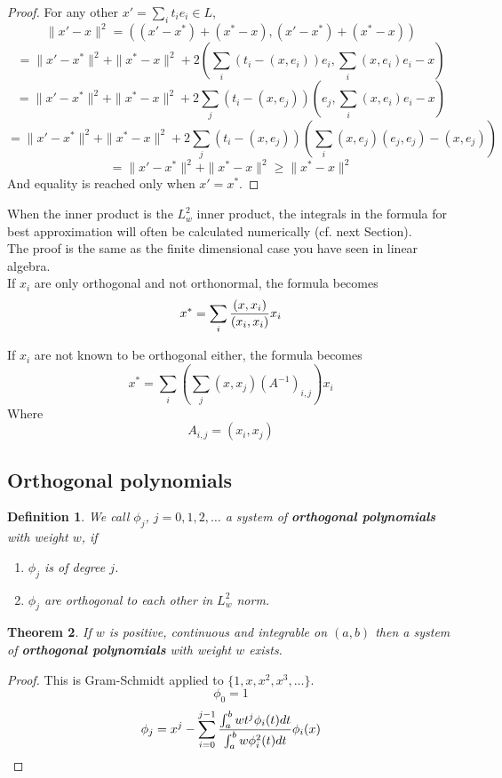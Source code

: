 \documentclass[20pt]{article} %
\theoremstyle{break}
\newtheorem{definition}{Definition}[section]
\newtheorem{thm}[definition]{Theorem}
\begin{document}
\begin{proof}
  For any other $x'=\sum_i t_ie_i\in L$,
  \[\|x'-x\|^2=((x'-x^*)+(x^*-x), (x'-x^*)+(x^*-x))\]
  \[=\|x'-x^*\|^2+\|x^*-x\|^2+2(\sum_i(t_i-(x, e_i))e_i, \sum_i(x, e_i)e_i-x)\]
  \[=\|x'-x^*\|^2+\|x^*-x\|^2+2\sum_j(t_i-(x, e_j))(e_j, \sum_i(x, e_i)e_i-x)\]
  \[=\|x'-x^*\|^2+\|x^*-x\|^2+2\sum_j(t_i-(x, e_j))(\sum_i(x, e_j)(e_j, e_j)-(x, e_j))\]
  \[=\|x'-x^*\|^2+\|x^*-x\|^2\geq \|x^*-x\|^2\]
  And equality is reached only when $x'=x^*$.
\end{proof}

\newpage

When the inner product is the $L^2_w$ inner product, the integrals in the formula for best approximation will often be calculated numerically (cf. next Section).\\

The proof is the same as the finite dimensional case you have seen in linear algebra.\\

If $x_i$ are only orthogonal and not orthonormal, the formula becomes
\[x^*=\sum_i{(x, x_i)\over (x_i, x_i)}x_i\]

If $x_i$ are not known to be orthogonal either, the formula becomes
\[x^*=\sum_i(\sum_j(x, x_j)(A^{-1})_{i, j})x_i\]
Where
\[A_{i,j}=(x_i, x_j)\]

\newpage

\subsection{Orthogonal polynomials}

\begin{definition}We call $\phi_j$, $j=0, 1, 2, \dots$ a system of {\bf orthogonal polynomials} with weight $w$, if 
  \begin{enumerate}
   \item $\phi_j$ is of degree $j$.
   \item $\phi_j$ are orthogonal to each other in $L^2_w$ norm.
  \end{enumerate}
\end{definition}

\begin{thm}\label{orth_exist} If $w$ is positive, continuous and integrable on $(a, b)$ then a system of {\bf orthogonal polynomials} with weight $w$ exists. \end{thm}

\begin{proof}
  This is Gram-Schmidt applied to $\{1, x, x^2, x^3, \dots\}$.
  \[\phi_0=1\]
  \[\phi_j=x^j-\sum_{i=0}^{j-1}{\int_a^b wt^j\phi_i(t)dt\over \int_a^b w\phi_i^2(t)dt}\phi_i(x)\] 
\end{proof}
\end{document}
